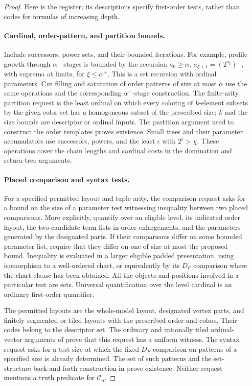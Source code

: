 \begin{proof}
Here is the register; its descriptions specify first-order tests, rather
than codes for formulas of increasing depth.

\paragraph{Cardinal, order-pattern, and partition bounds.}
Include successors, power sets, and their bounded iterations.  For
example, profile growth through $\alpha^+$ stages is bounded by the
recursion $a_0\ge\alpha$, $a_{\xi+1}=(2^{a_\xi})^+$, with suprema at
limits, for $\xi\le\alpha^+$.  This is a set recursion with ordinal
parameters.  Cut filling and saturation of order patterns of size at
most $\alpha$ use the same operations and the corresponding
$\alpha^+$-stage construction.  The finite-arity partition request is
the least ordinal on which every coloring of $k$-element subsets by the
given color set has a homogeneous subset of the prescribed size; $k$
and the size bounds are descriptor or ordinal inputs.  The partition
argument used to construct the order templates proves existence.
Small trees and their parameter accumulators use successors, powers,
and the least $\epsilon$ with $2^\epsilon>\chi$.  These operations cover
the chain lengths and cardinal costs in the domination and return-tree
arguments.

\paragraph{Placed comparison and syntax tests.}
For a specified permitted layout and tuple arity, the comparison request
asks for a bound on the size of a parameter test witnessing inequality
between two placed comparisons.  More explicitly, quantify over an
eligible level, its indicated order layout, the two candidate term lists
in order enlargements, and the parameters generated by the designated
parts.  If their comparisons differ on some bounded parameter list,
require that they differ on one of size at most the proposed bound.
Inequality is evaluated in a larger eligible padded presentation,
using isomorphism to a well-ordered chart, or equivalently by its $D_F$
comparison where the chart clause has been obtained.  All the objects
and positions involved in a particular test are sets.  Universal
quantification over the level cardinal is an ordinary first-order
quantifier.

The permitted layouts are the whole-model layout, designated vertex
parts, and finitely segmented or tiled layouts with the prescribed
order and colors.  Their codes belong to the descriptor set.  The
ordinary and rationally tiled ordinal-vector arguments of
 prove that this request has a
uniform witness.  The syntax request asks for a test size at which the fixed
$D_F$ comparison on patterns of a specified size is already determined.
The set of such patterns and the set-structure back-and-forth
construction in  prove existence.  Neither
request mentions a truth predicate for $\mathcal C_n$.


\end{proof}

